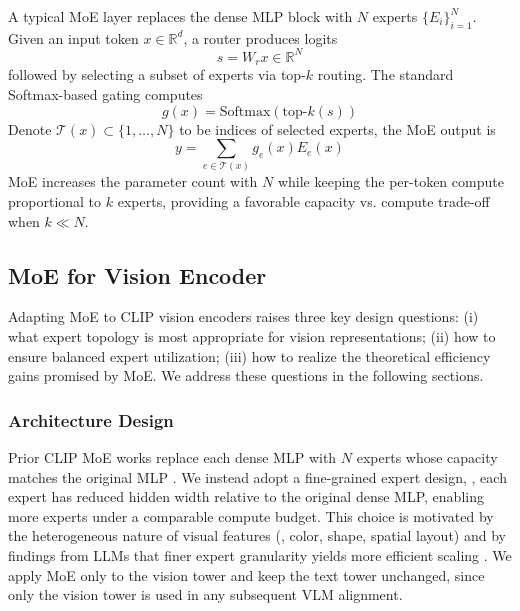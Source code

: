 \documentclass[runningheads]{llncs}
\begin{document}
A typical MoE layer replaces the dense MLP block with $N$ experts $\{E_i\}_{i=1}^{N}$. Given an input token $x\in\mathbb{R}^{d}$, a router produces logits
\begin{equation}
s = W_r x \in \mathbb{R}^{N}
\end{equation}
followed by selecting a subset of experts via top-$k$ routing. The standard Softmax-based gating computes
\begin{equation}
\label{router_eq}
g(x) = \mathrm{Softmax}(\text{top-}k(s))
\end{equation}
Denote $\mathcal{T}(x)\subset\{1,\dots,N\}$ to be indices of selected experts, the MoE output is 
\begin{equation}
    y = \sum_{e\in \mathcal{T}(x)}{g_e(x)E_e(x)}  
\end{equation}
MoE increases the parameter count with $N$ while keeping the per-token compute proportional to $k$ experts, providing a favorable capacity vs. compute trade-off when $k\ll N$.

\subsection{MoE for Vision Encoder}

Adapting MoE to CLIP vision encoders raises three key design questions: (i) what expert topology is most appropriate for vision representations; (ii) how to ensure balanced expert utilization; (iii) how to realize the theoretical efficiency gains promised by MoE. We address these questions in the following sections.

\subsubsection{Architecture Design}

Prior CLIP MoE works replace each dense MLP with $N$ experts whose capacity matches the original MLP \cite{clip_moe,moe_clipup,liemoe,moe_cumo}. We instead adopt a fine-grained expert design, \ie, each expert has reduced hidden width relative to the original dense MLP, enabling more experts under a comparable compute budget. This choice is motivated by the heterogeneous nature of visual features (\eg, color, shape, spatial layout) and by findings from LLMs that finer expert granularity yields more efficient scaling \cite{deepseekmoe}. We apply MoE only to the vision tower and keep the text tower unchanged, since only the vision tower is used in any subsequent VLM alignment. 
\end{document}
